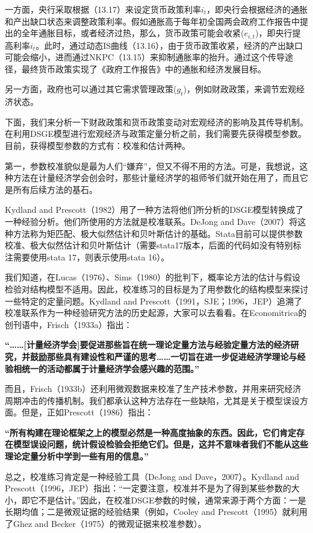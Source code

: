 \documentclass[cn,12pt,math=newtx,citestyle=gb7714-2015,bibstyle=gb7714-2015]{elegantbook}
\begin{document}
    一方面，央行采取根据（13.17）来设定货币政策利率$i_t$，即央行会根据经济的通胀和产出缺口状态来调整政策利率。假如通胀高于每年初全国两会政府工作报告中提出的全年通胀目标，或者经济过热，那么，货币政策可能会收紧($e_{i,t}$)，即央行提高利率$i_t$。此时，通过动态IS曲线（13.16），由于货币政策收紧，经济的产出缺口可能会缩小，进而通过NKPC（13.15）来抑制通胀率的抬升。通过这个传导途径，最终货币政策实现了《政府工作报告》中的通胀和经济发展目标。
    
    另一方面，政府也可以通过其它需求管理政策($g_t$)，例如财政政策，来调节宏观经济状态。
	
	下面，我们来分析一下财政政策和货币政策变动对宏观经济的影响及其传导机制。在利用DSGE模型进行宏观经济与政策定量分析之前，我们需要先获得模型参数。目前，获得模型参数的方式有：校准和估计两种。
	
	第一，参数校准貌似是最为人们“嫌弃”，但又不得不用的方法。可是，我想说，这种方法在计量经济学会创会时，那些计量经济学的祖师爷们就开始在用了，而且它是所有后续方法的基石。
	
	Kydland and Prescott（1982）用了一种方法将他们所分析的DSGE模型转换成了一种经验分析。他们所使用的方法就是校准联系。DeJong and Dave（2007）将这种方法称为矩匹配、极大似然估计和贝叶斯估计的基础。Stata目前可以提供参数校准、极大似然估计和贝叶斯估计（需要stata17版本，后面的代码如没有特别标注需要使用stata 17，则表示使用stata 16）。
	
	我们知道，在Lucas（1976）、Sims（1980）的批判下，概率论方法的估计与假设检验对结构模型不适用。因此，校准练习的目标是为了用参数化的结构模型来探讨一些特定的定量问题。Kydland and Prescott（1991，SJE；1996，JEP）追溯了校准联系作为一种经验研究方法的历史起源，大家可以去看看。在Economitrica的创刊语中，Frisch（1933a）指出：
	
	\textbf{“……[计量经济学会]要促进那些旨在统一理论定量方法与经验定量方法的经济研究，并鼓励那些具有建设性和严谨的思考……一切旨在进一步促进经济学理论与经验相统一的活动都属于计量经济学会感兴趣的范围。”}
	
	而且，Frisch（1933b）还利用微观数据来校准了生产技术参数，并用来研究经济周期冲击的传播机制。我们都承认这种方法存在一些缺陷，尤其是关于模型误设方面。但是，正如Prescott（1986）指出：
	
	\textbf{“所有构建在理论框架之上的模型必然是一种高度抽象的东西。因此，它们肯定存在模型误设问题，统计假设检验会拒绝它们。但是，这并不意味者我们不能从这些理论定量分析中学到一些有用的信息。”}
	
	总之，校准练习肯定是一种经验工具（DeJong and Dave，2007）。Kydland and Prescott（1996，JEP）指出：“一定要注意，校准并不是为了得到某些参数的大小，即它不是估计。”因此，在校准DSGE参数的时候，通常来源于两个方面：一是长期均值；二是微观证据的经验结果（例如，Cooley and Prescott（1995）就利用了Ghez and Becker（1975）的微观证据来校准参数）。
	
\end{document}
